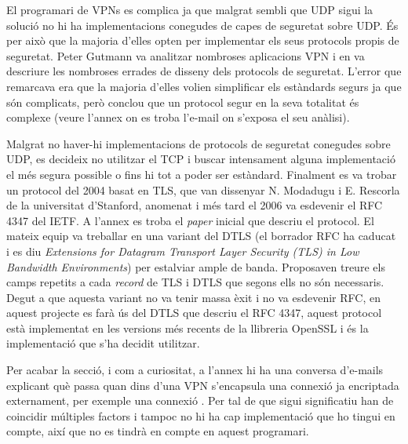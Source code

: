El programari de VPNs es complica ja que malgrat sembli que UDP sigui la solució no hi ha implementacions conegudes de capes de seguretat sobre UDP. És per això que la majoria d'elles opten per implementar els seus protocols propis de seguretat.
Peter Gutmann va analitzar nombroses aplicacions VPN i en va descriure les nombroses errades de disseny dels protocols de seguretat. L'error que remarcava era que la majoria d'elles volien simplificar els estàndards segurs ja que són complicats, però conclou que un protocol segur en la seva totalitat és complexe (veure l'annex  on es troba l'e-mail on s'exposa el seu anàlisi).

Malgrat no haver-hi implementacions de protocols de seguretat conegudes sobre UDP, es decideix no utilitzar el TCP i buscar intensament alguna implementació el més segura possible o fins hi tot a poder ser estàndard. Finalment es va trobar un protocol del 2004 basat en TLS, que van dissenyar N. Modadugu i E. Rescorla de la universitat d'Stanford, anomenat  i més tard el 2006 va esdevenir el RFC 4347 del IETF. A l'annex  es troba el \emph{paper} inicial que descriu el protocol. El mateix equip va treballar en una variant del DTLS (el borrador RFC ha caducat i es diu \emph{Extensions for Datagram Transport Layer Security (TLS) in Low Bandwidth Environments}) per estalviar ample de banda. Proposaven treure els camps repetits a cada \emph{record} de TLS i DTLS que segons ells no són necessaris. Degut a que aquesta variant no va tenir massa èxit i no va esdevenir RFC, en aquest projecte es farà ús del DTLS que descriu el RFC 4347, aquest protocol està implementat en les versions més recents de la llibreria OpenSSL i és la implementació que s'ha decidit utilitzar.

Per acabar la secció, i com a curiositat, a l'annex  hi ha una conversa d'e-mails explicant què passa quan dins d'una VPN s'encapsula una connexió ja encriptada externament, per exemple una connexió . Per tal de que sigui significatiu han de coincidir múltiples factors i tampoc no hi ha cap implementació que ho tingui en compte, així que no es tindrà en compte en aquest programari.

